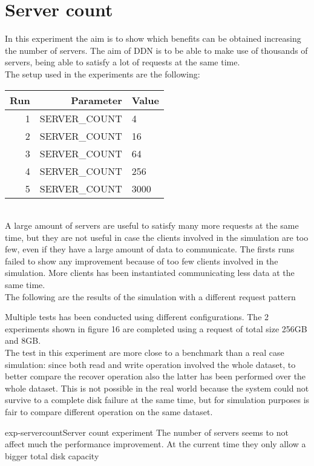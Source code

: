 \section{Server count}
In this experiment the aim is to show which benefits can be obtained increasing
the number of servers. The aim of DDN is to be able to make use of thousands of
servers, being able to satisfy a lot of requests at the same time. \\
The setup used in the experiments are the following: \\
\begin{tabular}{r | r | l}
    \textbf{Run} & \textbf{Parameter} & \textbf{Value} \\\hline
    1 & SERVER\_COUNT & 4 \\
    2 & SERVER\_COUNT & 16 \\
    3 & SERVER\_COUNT & 64 \\
    4 & SERVER\_COUNT & 256 \\
    5 & SERVER\_COUNT & 3000 \\
\end{tabular} \\

A large amount of servers are useful to satisfy many more requests at the same
time, but they are not useful in case the clients involved in the simulation are
too few, even if they have a large amount of data to communicate. The firsts
runs failed to show any improvement because of too few clients involved in the
simulation. More clients has been instantiated communicating less data at the
same time. \\
The following are the results of the simulation with a different request pattern

Multiple tests has been conducted using different configurations. The 2
experiments shown in figure 16 are completed using a request of total size 256GB
and 8GB.\\
The test in this experiment are more close to a benchmark than a real case
simulation: since both read and write operation involved the whole dataset, to
better compare the recover operation also the latter has been performed over the
whole dataset. This is not possible in the real world because the system
could not survive to a complete disk failure at the same time, but for
simulation purposes is fair to compare different operation on the same
dataset.\\

\begin{myimage}{exp-servercount}{Server count experiment}
    The number of servers seems to not affect much the performance improvement.
    At the current time they only allow a bigger total disk capacity
\end{myimage} \\

